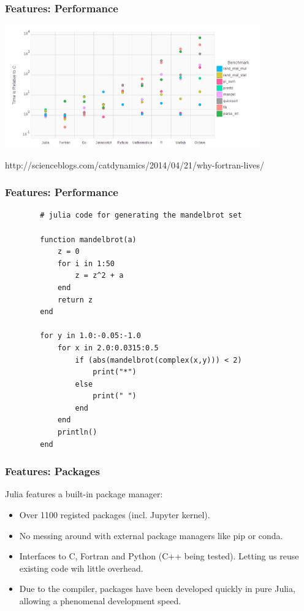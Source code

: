 \documentclass{beamer}
\begin{document}
\begin{frame}
	\frametitle{Features: Performance}

	\includegraphics[width=11cm]{Images/perf1.jpg} \newline

	\small http://scienceblogs.com/catdynamics/2014/04/21/why-fortran-lives/
\end{frame}

\begin{frame}[fragile]
	\frametitle{Features: Performance}

	\small \begin{verbatim}
		# julia code for generating the mandelbrot set

		function mandelbrot(a)
		    z = 0
		    for i in 1:50
		        z = z^2 + a
		    end
		    return z
		end

		for y in 1.0:-0.05:-1.0
		    for x in 2.0:0.0315:0.5
		        if (abs(mandelbrot(complex(x,y))) < 2)
		            print("*")
		        else
		            print(" ")
		        end
		    end
		    println()
		end
	\end{verbatim}
\end{frame}

\begin{frame}
	\frametitle{Features: Packages}

	Julia features a built-in package manager: \newline

	\begin{itemize}
		\item Over 1100 registed packages (incl. Jupyter kernel). \newline

		\item No messing around with external package managers like pip or conda. \newline

		\item Interfaces to C, Fortran and Python (C++ being tested). Letting us reuse existing code wih little overhead. \newline

		\item Due to the compiler, packages have been developed quickly in pure Julia, allowing a phenomenal development speed.
	\end{itemize}
\end{frame}
\end{document}

